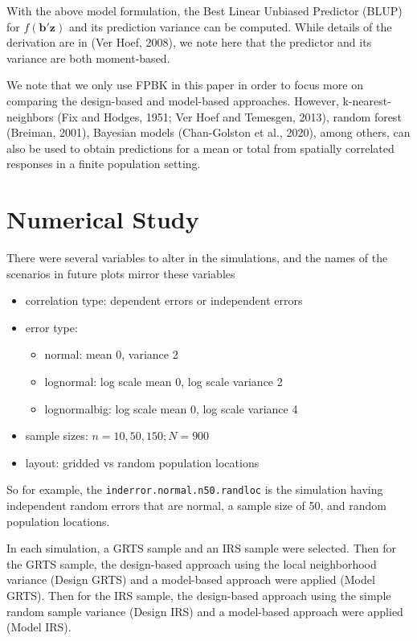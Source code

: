 \documentclass[]{elsarticle} %
\providecommand{\tightlist}{%
  \setlength{\itemsep}{0pt}\setlength{\parskip}{0pt}}
\begin{document}
With the above model formulation, the Best Linear Unbiased Predictor
(BLUP) for \(f(\mathbf{b}'\mathbf{z})\) and its prediction variance can
be computed. While details of the derivation are in (Ver Hoef, 2008), we
note here that the predictor and its variance are both moment-based.

We note that we only use FPBK in this paper in order to focus more on
comparing the design-based and model-based approaches. However,
k-nearest-neighbors (Fix and Hodges, 1951; Ver Hoef and Temesgen, 2013),
random forest (Breiman, 2001), Bayesian models (Chan-Golston et al.,
2020), among others, can also be used to obtain predictions for a mean
or total from spatially correlated responses in a finite population
setting.

\hypertarget{sec:numstudy}{%
\section{Numerical Study}\label{sec:numstudy}}

There were several variables to alter in the simulations, and the names
of the scenarios in future plots mirror these variables

\begin{itemize}
\tightlist
\item
  correlation type: dependent errors or independent errors
\item
  error type:

  \begin{itemize}
  \tightlist
  \item
    normal: mean 0, variance 2
  \item
    lognormal: log scale mean 0, log scale variance 2
  \item
    lognormalbig: log scale mean 0, log scale variance 4
  \end{itemize}
\item
  sample sizes: \(n = 10, 50, 150; N = 900\)
\item
  layout: gridded vs random population locations
\end{itemize}

So for example, the \texttt{inderror.normal.n50.randloc} is the
simulation having independent random errors that are normal, a sample
size of 50, and random population locations.

In each simulation, a GRTS sample and an IRS sample were selected. Then
for the GRTS sample, the design-based approach using the local
neighborhood variance (Design GRTS) and a model-based approach were
applied (Model GRTS). Then for the IRS sample, the design-based approach
using the simple random sample variance (Design IRS) and a model-based
approach were applied (Model IRS).
\end{document}
